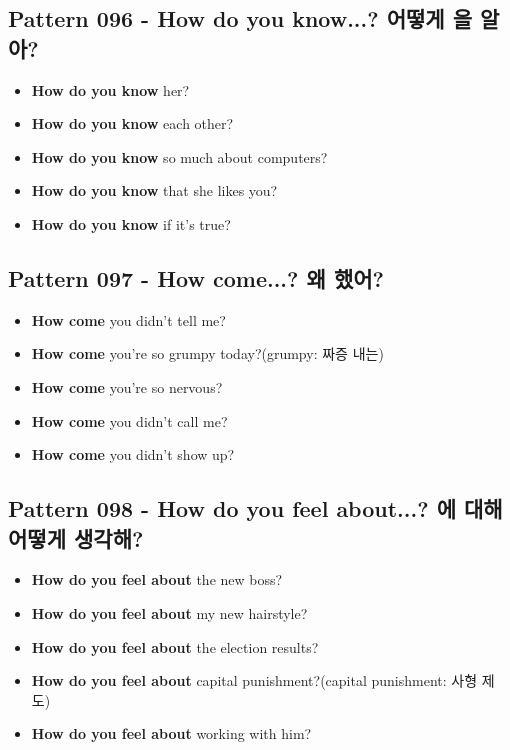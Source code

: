 \documentclass[11pt]{oblivoir}
\begin{document}
\subsection{Pattern 096 - How do you know...? 어떻게 \texttildelow 을 알아?}
\begin{itemize}
  \item \textbf{How do you know} her?
  \item \textbf{How do you know} each other?
  \item \textbf{How do you know} so much about computers?
  \item \textbf{How do you know} that she likes you?
  \item \textbf{How do you know} if it's true?
\end{itemize}

\subsection{Pattern 097 - How come...? 왜 \texttildelow 했어?}
\begin{itemize}
  \item \textbf{How come} you didn't tell me?
  \item \textbf{How come} you're so grumpy today?(grumpy: 짜증 내는)
  \item \textbf{How come} you're so nervous?
  \item \textbf{How come} you didn't call me?
  \item \textbf{How come} you didn't show up?
\end{itemize}

\subsection{Pattern 098 - How do you feel about...? \texttildelow 에 대해 어떻게 생각해?}
\begin{itemize}
  \item \textbf{How do you feel about} the new boss?
  \item \textbf{How do you feel about} my new hairstyle?
  \item \textbf{How do you feel about} the election results?
  \item \textbf{How do you feel about} capital punishment?(capital punishment: 사형 제도)
  \item \textbf{How do you feel about} working with him?
\end{itemize}
\end{document}
